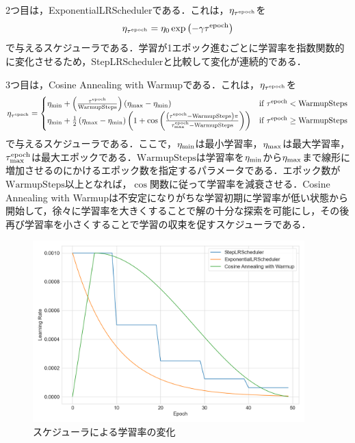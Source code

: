 2つ目は，ExponentialLRSchedulerである．これは，$\eta_{\tau^{\text{epoch}}}$を
\begin{equation}
    \eta_{\tau^{\text{epoch}}} = \eta_{0} \exp \left( -\gamma \tau^{\text{epoch}} \right)
\end{equation}
で与えるスケジューラである．学習が1エポック進むごとに学習率を指数関数的に変化させるため，StepLRSchedulerと比較して変化が連続的である．

3つ目は，Cosine Annealing with Warmupである．これは，$\eta_{\tau^{\text{epoch}}}$を
\begin{equation}
    \eta_{\tau^{\text{epoch}}} =
    \begin{cases}
        \eta_{\text{min}} + \left( \frac{\tau^{\text{epoch}}}{\text{WarmupSteps}} \right) \left(\eta_{\text{max}} - \eta_{\text{min}}\right)                                                                                & \text{if $\tau^{\text{epoch}} < \text{WarmupSteps}$}   \\
        \eta_{\text{min}} + \frac{1}{2} \left(\eta_{\text{max}} - \eta_{\text{min}}\right) \left( 1 + \cos \left( \frac{\left(\tau^{\text{epoch}} - \text{WarmupSteps}\right)\pi}{\tau^{\text{epoch}}_{\text{max}} - \text{WarmupSteps}} \right) \right) & \text{if $\tau^{\text{epoch}} \ge \text{WarmupSteps}$}
    \end{cases}
\end{equation}
で与えるスケジューラである．ここで，$\eta_{\text{min}}$は最小学習率，$\eta_{\text{max}}$は最大学習率，$\tau^{\text{epoch}}_{\text{max}}$は最大エポックである．$\text{WarmupSteps}$は学習率を$\eta_{\text{min}}$から$\eta_{\text{max}}$まで線形に増加させるのにかけるエポック数を指定するパラメータである．エポック数が$\text{WarmupSteps}$以上となれば，$\cos$関数に従って学習率を減衰させる．Cosine Annealing with Warmupは不安定になりがちな学習初期に学習率が低い状態から開始して，徐々に学習率を大きくすることで解の十分な探索を可能にし，その後再び学習率を小さくすることで学習の収束を促すスケジューラである．

\begin{figure}[bt]
    \centering
    \includegraphics[height=70mm]{./figure/sec3/lr_scheduler.png}
    \caption{スケジューラによる学習率の変化}
    \label{sec3:fig:lr_scheduler}
\end{figure}

